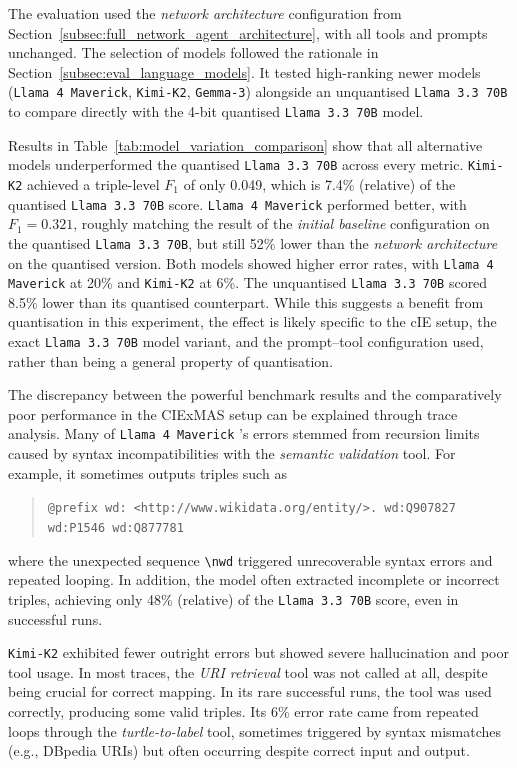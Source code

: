 \documentclass[a4paper,oneside,bibliography=totoc]{scrbook}
\begin{document}
The evaluation used the \textit{network architecture} configuration from Section~\ref{subsec:full_network_agent_architecture}, with all tools and prompts unchanged. The selection of models followed the rationale in Section~\ref{subsec:eval_language_models}. It tested high-ranking newer models (\texttt{Llama 4 Maverick}, \texttt{Kimi-K2}, \texttt{Gemma-3}) alongside an unquantised \texttt{Llama 3.3 70B} to compare directly with the 4-bit quantised \texttt{Llama 3.3 70B} model.

Results in Table~\ref{tab:model_variation_comparison} show that all alternative models underperformed the quantised \texttt{Llama 3.3 70B} across every metric. \texttt{Kimi-K2} achieved a triple-level $F_{1}$ of only 0.049, which is 7.4\% (relative) of the quantised \texttt{Llama 3.3 70B} score. \texttt{Llama 4 Maverick} performed better, with $F_{1}=0.321$, roughly matching the result of the \textit{initial baseline} configuration on the quantised \texttt{Llama 3.3 70B}, but still 52\% lower than the \textit{network architecture} on the quantised version. Both models showed higher error rates, with \texttt{Llama 4 Maverick} at 20\% and \texttt{Kimi-K2} at 6\%. The unquantised \texttt{Llama 3.3 70B} scored 8.5\% lower than its quantised counterpart. While this suggests a benefit from quantisation in this experiment, the effect is likely specific to the \ac{cIE} setup, the exact \texttt{Llama 3.3 70B} model variant, and the prompt–tool configuration used, rather than being a general property of quantisation.

The discrepancy between the powerful benchmark results and the comparatively poor performance in the CIExMAS setup can be explained through trace analysis. Many of \texttt{Llama 4 Maverick} 's errors stemmed from recursion limits caused by syntax incompatibilities with the \textit{semantic validation} tool. For example, it sometimes outputs triples such as
\begin{quote}
  \texttt{@prefix wd: <http://www.wikidata.org/entity/>.\newline
    wd:Q907827 wd:P1546 wd:Q877781}
\end{quote}
where the unexpected sequence \verb|\nwd| triggered unrecoverable syntax errors and repeated looping. In addition, the model often extracted incomplete or incorrect triples, achieving only 48\% (relative) of the \texttt{Llama 3.3 70B} score, even in successful runs.

\texttt{Kimi-K2} exhibited fewer outright errors but showed severe hallucination and poor tool usage. In most traces, the \textit{\ac{URI} retrieval} tool was not called at all, despite being crucial for correct mapping. In its rare successful runs, the tool was used correctly, producing some valid triples. Its 6\% error rate came from repeated loops through the \textit{turtle-to-label} tool, sometimes triggered by syntax mismatches (e.g., DBpedia \acp{URI}) but often occurring despite correct input and output.
\end{document}
